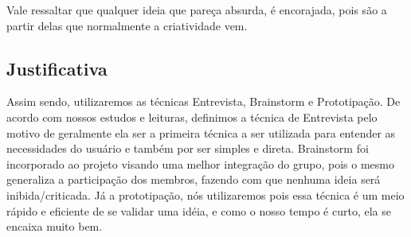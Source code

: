   Vale ressaltar que qualquer ideia que pareça absurda, é encorajada, pois são a partir delas que normalmente a criatividade vem.

\subsection{Justificativa}

  Assim sendo, utilizaremos as técnicas Entrevista, Brainstorm e Prototipação. De acordo com nossos estudos e leituras, definimos a técnica de Entrevista pelo motivo de geralmente ela ser a primeira técnica a ser utilizada para entender as necessidades do usuário e também por ser simples e direta. Brainstorm foi incorporado ao projeto visando uma melhor integração do grupo, pois o mesmo generaliza a participação dos membros, fazendo com que nenhuma ideia será inibida/criticada. Já a prototipação, nós utilizaremos pois essa técnica é um meio rápido e eficiente de se validar uma idéia, e como o nosso tempo é curto, ela se encaixa muito bem.

